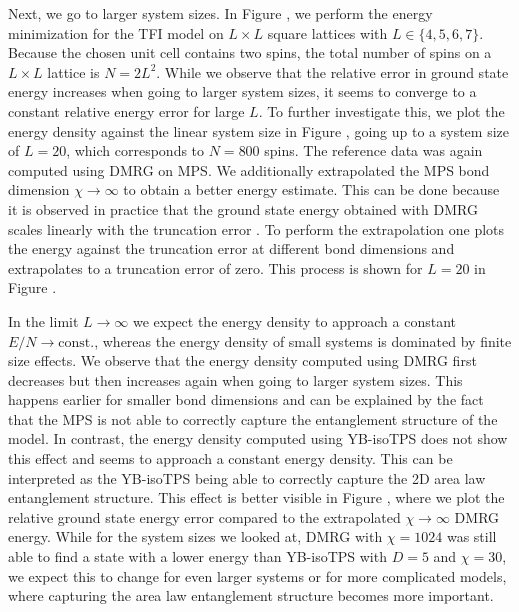 Next, we go to larger system sizes. In Figure , we perform the energy minimization for the TFI model on $L\times L$ square lattices with $L\in\{4,5,6,7\}$. Because the chosen unit cell contains two spins, the total number of spins on a $L\times L$ lattice is $N = 2L^2$. While we observe that the relative error in ground state energy increases when going to larger system sizes, it seems to converge to a constant relative energy error for large $L$. To further investigate this, we plot the energy density against the linear system size in Figure , going up to a system size of $L = 20$, which corresponds to $N = 800$ spins. The reference data was again computed using DMRG on MPS. We additionally extrapolated the MPS bond dimension $\chi\rightarrow\infty$ to obtain a better energy estimate. This can be done because it is observed in practice that the ground state energy obtained with DMRG scales linearly with the truncation error \cite{cite:accuracy_of_DMRG}. To perform the extrapolation one plots the energy against the truncation error at different bond dimensions and extrapolates to a truncation error of zero. This process is shown for $L=20$ in Figure . \par 
%



%
In the limit $L\rightarrow\infty$ we expect the energy density to approach a constant $E/N\rightarrow \text{const.}$, whereas the energy density of small systems is dominated by finite size effects. We observe that the energy density computed using DMRG first decreases but then increases again when going to larger system sizes. This happens earlier for smaller bond dimensions and can be explained by the fact that the MPS is not able to correctly capture the entanglement structure of the model. In contrast, the energy density computed using YB-isoTPS does not show this effect and seems to approach a constant energy density. This can be interpreted as the YB-isoTPS being able to correctly capture the 2D area law entanglement structure. This effect is better visible in Figure , where we plot the relative ground state energy error compared to the extrapolated $\chi\rightarrow\infty$ DMRG energy. While for the system sizes we looked at, DMRG with $\chi=1024$ was still able to find a state with a lower energy than YB-isoTPS with $D = 5$ and $\chi=30$, we expect this to change for even larger systems or for more complicated models, where capturing the area law entanglement structure becomes more important. \par
